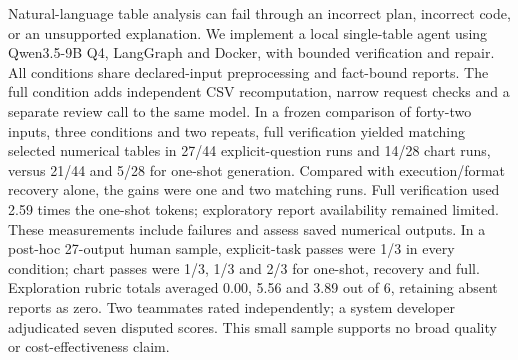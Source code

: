 Natural-language table analysis can fail through an incorrect plan, incorrect code, or an unsupported explanation. We implement a local single-table agent using Qwen3.5-9B Q4, LangGraph and Docker, with bounded verification and repair. All conditions share declared-input preprocessing and fact-bound reports. The full condition adds independent CSV recomputation, narrow request checks and a separate review call to the same model. In a frozen comparison of forty-two inputs, three conditions and two repeats, full verification yielded matching selected numerical tables in 27/44 explicit-question runs and 14/28 chart runs, versus 21/44 and 5/28 for one-shot generation. Compared with execution/format recovery alone, the gains were one and two matching runs. Full verification used 2.59 times the one-shot tokens; exploratory report availability remained limited. These measurements include failures and assess saved numerical outputs. In a post-hoc 27-output human sample, explicit-task passes were 1/3 in every condition; chart passes were 1/3, 1/3 and 2/3 for one-shot, recovery and full. Exploration rubric totals averaged 0.00, 5.56 and 3.89 out of 6, retaining absent reports as zero. Two teammates rated independently; a system developer adjudicated seven disputed scores. This small sample supports no broad quality or cost-effectiveness claim.
